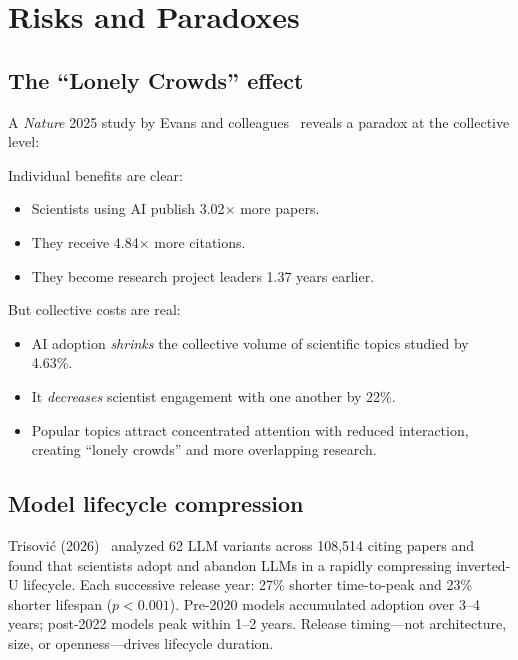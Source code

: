 \documentclass[11pt,a4paper]{article}
\begin{document}
\section{Risks and Paradoxes}
\label{sec:risks}

\subsection{The ``Lonely Crowds'' effect}

A \emph{Nature} 2025 study by Evans and colleagues~\cite{lonelycrowds2025} reveals a paradox at the collective level:

Individual benefits are clear:
\begin{itemize}
\item Scientists using AI publish 3.02$\times$ more papers.
\item They receive 4.84$\times$ more citations.
\item They become research project leaders 1.37 years earlier.
\end{itemize}

But collective costs are real:
\begin{itemize}
\item AI adoption \emph{shrinks} the collective volume of scientific topics studied by 4.63\%.
\item It \emph{decreases} scientist engagement with one another by 22\%.
\item Popular topics attract concentrated attention with reduced interaction, creating ``lonely crowds'' and more overlapping research.
\end{itemize}

\subsection{Model lifecycle compression}

Trisovi\'{c} (2026)~\cite{trisovic2026} analyzed 62 LLM variants across 108,514 citing papers and found that scientists adopt and abandon LLMs in a rapidly compressing inverted-U lifecycle. Each successive release year: 27\% shorter time-to-peak and 23\% shorter lifespan ($p<0.001$). Pre-2020 models accumulated adoption over 3--4 years; post-2022 models peak within 1--2 years. Release timing---not architecture, size, or openness---drives lifecycle duration.
\end{document}
